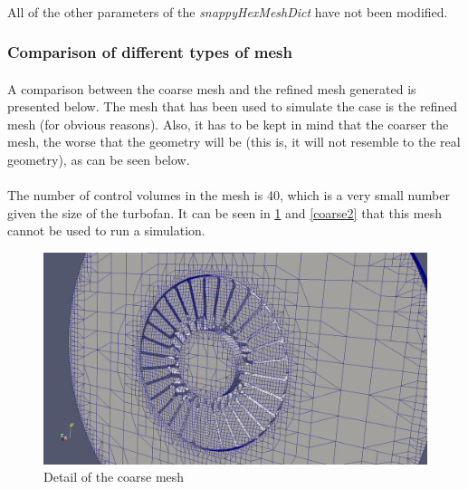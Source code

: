 \paragraph{}All of the other parameters of the \textit{snappyHexMeshDict} have not been modified.

\subsubsection{Comparison of different types of mesh}


\paragraph{}A comparison between the coarse mesh and the refined mesh generated is presented below. The mesh that has been used to simulate the case is the refined mesh (for obvious reasons). Also, it has to be kept in mind that the coarser the mesh, the worse that the geometry will be (this is, it will not resemble to the real geometry), as can be seen below.

\newpage{}

\paragraph{}The number of control volumes in the mesh is 40, which is a very small number given the size of the turbofan. It can be seen in \ref{coarse1} and \ref{coarse2} that this mesh cannot be used to run a simulation.

\begin{figure}[h!]
\includegraphics[scale=0.24]{./mesh/screenshots/coarse2}
\centering
\caption{Detail of the coarse mesh}
\label{coarse1}
\end{figure}

